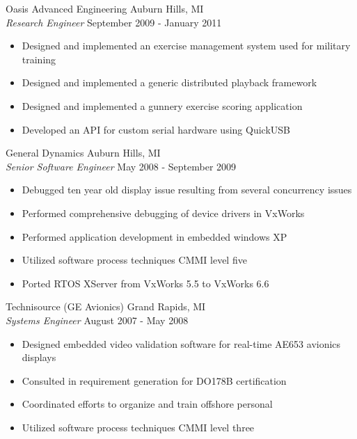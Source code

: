 \documentclass[line]{res}
\begin{document}
\begin{resume}
    \vspace{-2mm}
    Oasis Advanced Engineering \hfill Auburn Hills, MI\\
    {\sl Research Engineer} \hfill September 2009 - January 2011
    \vspace{1mm}
    \begin{itemize}
       \item Designed and implemented an exercise management system used for military training
       \item Designed and implemented a generic distributed playback framework
       \item Designed and implemented a gunnery exercise scoring application
       \item Developed an API for custom serial hardware using QuickUSB
    \end{itemize}

    \vspace{-2mm}
    General Dynamics \hfill Auburn Hills, MI\\
    {\sl Senior Software Engineer} \hfill May 2008 - September 2009
    \vspace{1mm}
    \begin{itemize}
       \item Debugged ten year old display issue resulting from several concurrency issues
       \item Performed comprehensive debugging of device drivers in VxWorks
       \item Performed application development in embedded windows XP
       \item Utilized software process techniques CMMI level five
       \item Ported RTOS XServer from VxWorks 5.5 to VxWorks 6.6
    \end{itemize}

    \vspace{-2mm}
    Technisource (GE Avionics) \hfill Grand Rapids, MI\\
    {\sl Systems Engineer} \hfill August 2007 - May 2008
    \vspace{1mm}
    \begin{itemize}
      \item Designed embedded video validation software for real-time AE653 avionics displays
      \item Consulted in requirement generation for DO178B certification
      \item Coordinated efforts to organize and train offshore personal
      \item Utilized software process techniques CMMI level three
    \end{itemize}


\end{resume}
\end{document}
